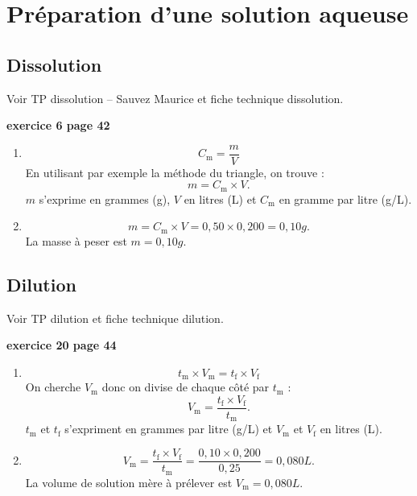 \documentclass[12pt,a4paper]{article}
\begin{document}
\section{Préparation d'une solution aqueuse}

\subsection{Dissolution}

Voir TP dissolution -- Sauvez Maurice et fiche technique dissolution.

\begin{exemple}
\textbf{exercice 6 page 42}

\begin{enumerate}
\item 
\[
C_\mathrm{m} = \frac{m}{V}
\]
En utilisant par exemple la méthode du triangle, on trouve :
\[
m = C_\mathrm{m} \times V.
\]
$m$ s'exprime en grammes (g), $V$ en litres (L) et $C_\mathrm{m}$ en gramme par litre (g/L).

\item 
\[
m = C_\mathrm{m} \times V = 0{,}50 \times 0{,}200 = \unit{0{,}10}{g}.
\]
La masse à peser est $m = \unit{0{,}10}{g}$.
\end{enumerate}
\end{exemple}

\subsection{Dilution}

Voir TP dilution et fiche technique dilution.

\begin{exemple}
\textbf{exercice 20 page 44}

\begin{enumerate}
\item 
\[
t_\mathrm{m} \times V_\mathrm{m} = t_\mathrm{f} \times V_\mathrm{f}
\]
On cherche $V_\mathrm{m}$ donc on divise de chaque côté par $t_\mathrm{m}$ :
\[
V_\mathrm{m} = \frac{t_\mathrm{f} \times V_\mathrm{f}}{t_\mathrm{m}}.
\]
$t_\mathrm{m}$ et $t_\mathrm{f}$ s'expriment en grammes par litre (g/L) et  $V_\mathrm{m}$ et $V_\mathrm{f}$ en litres (L).

\item 
\[
V_\mathrm{m} = \frac{t_\mathrm{f} \times V_\mathrm{f}}{t_\mathrm{m}} = \frac{0{,}10 \times 0{,}200}{0{,}25} = \unit{0{,}080}{L}.
\]
La volume de solution mère à prélever est $V_\mathrm{m}  = \unit{0{,}080}{L}$.
\end{enumerate}
\end{exemple}
\end{document}
